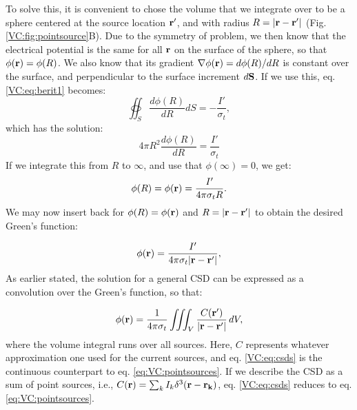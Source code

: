 To solve this, it is convenient to chose the volume that we integrate over to be a sphere centered at the source location ${\bf r'}$, and with radius $R = |{\bf r-r'}|$ (Fig. \ref{VC:fig:pointsource}B). Due to the symmetry of problem, we then know that the electrical potential is the same for all ${\bf r}$ on the surface of the sphere, so that $\phi({\bf r}) = \phi(R)$. We also know that its gradient $\nabla\phi({\bf r}) = d\phi(R)/dR$ is constant over the surface, and perpendicular to the surface increment $d{\bf S}$. If we use this, eq. \ref{VC:eq:berit1} becomes:
\begin{equation}
\oiint_{S} \frac{d\phi(R)}{dR} d{S}  = - \frac{I'}{\sigma_t},
\label{VC:eq:berit1ogenhalv}
\end{equation}
which has the solution:
\begin{equation}
4\pi R^2 \frac{d\phi(R)}{dR} = \frac{I'}{\sigma_t}
\label{VC:eq:berit2}
\end{equation}
If we integrate this from $R$ to $\infty$, and use that $\phi(\infty) = 0$, we get:
\begin{equation}
\phi(R) = \phi({\bf r}) = \frac{I'}{4\pi \sigma_t R}.
\label{VC:eq:berit3}
\end{equation}
We may now insert back for $\phi(R)= \phi({\bf r})$ and $R = |{\bf r-r'}|$ to obtain the desired Green's function:

\begin{equation}
\phi({\bf r})= \frac{I'}{4\pi \sigma_t |{\bf r-r'}|},
\label{VC:eq:berit4}
\end{equation}
As earlier stated, the solution for a general CSD can be expressed as a convolution over the Green's function, so that:

\begin{equation}
\phi({\bf r}) = \frac{1}{4\pi \sigma_t}\iiint_V \frac{C({\bf r'})}{|{\bf r}-{\bf r'}|} \,dV, 
\label{VC:eq:csds}
\end{equation}
where the volume integral runs over all sources. Here, $C$ represents whatever approximation one used for the current sources, and eq. \ref{VC:eq:csds} is the continuous counterpart to eq. \ref{eq:VC:pointsources}. If we describe the CSD as a sum of point sources, i.e.,  $C({\bf r}) = \sum_k I_k \delta^3({\bf r} - {\bf r_k})$, eq. \ref{VC:eq:csds} reduces to eq.\ref{eq:VC:pointsources}.


